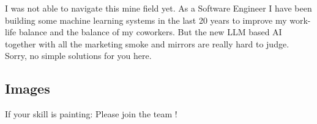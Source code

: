 I was not able to navigate this mine field yet. As a Software Engineer I have been building some machine learning systems in the last 20 years to improve my work-life balance and the balance of my coworkers. But the new LLM based AI together with all the marketing smoke and mirrors are really hard to judge. Sorry, no simple solutions for you here.


\subsection{Images}

If your skill is painting: Please join the team !

